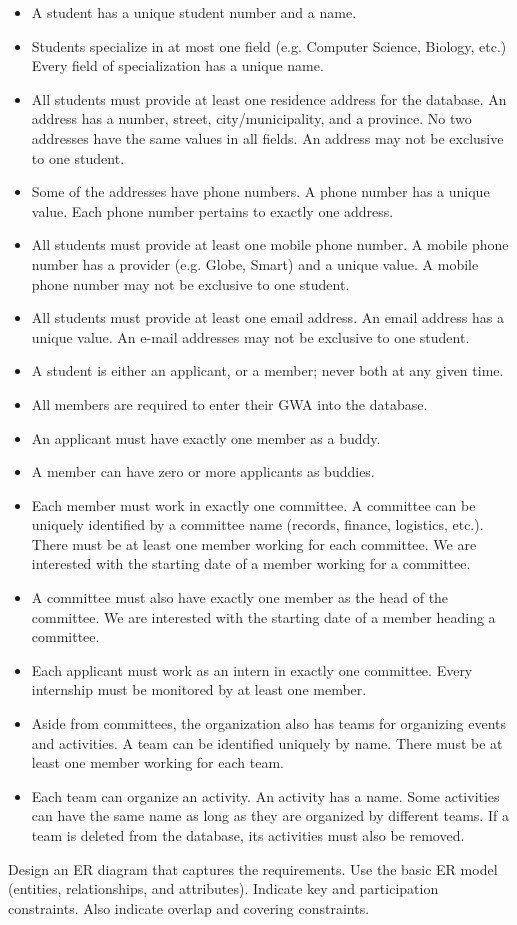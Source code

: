 \documentclass[12pt]{article}
\begin{document}
\begin{itemize}
  \item A student has a unique student number and a name.
  \item Students specialize in at most one field (e.g. Computer Science, Biology, etc.) Every field of specialization has a unique name.
  \item All students must provide at least one residence address for the database. An address has a number, street, city/municipality, and a province. No two addresses have the same values in all fields. An address may not be exclusive to one student. 
  \item Some of the addresses have phone numbers. A phone number has a unique value. Each phone number pertains to exactly one address.
  \item All students must provide at least one mobile phone number. A mobile phone number has a provider (e.g. Globe, Smart) and a unique value. A mobile phone number may not be exclusive to one student.
  \item All students must provide at least one email address. An email address has a unique value. An e-mail addresses may not be exclusive to one student.
  \item A student is either an applicant, or a member; never both at any given time.
  \item All members are required to enter their GWA into the database.
  \item An applicant must have exactly one member as a buddy.
  \item A member can have zero or more applicants as buddies.
  \item Each member must work in exactly one committee. A committee can be uniquely identified by a committee name (records, finance, logistics, etc.). There must be at least one member working for each committee. We are interested with the starting date of a member working for a committee.
  \item A committee must also have exactly one member as the head of the committee. We are interested with the starting date of a member heading a committee.
  \item Each applicant must work as an intern in exactly one committee. Every internship must be monitored by at least one member.
  \item Aside from committees, the organization also has teams for organizing events and activities. A team can be identified uniquely by name. There must be at least one member working for each team.
  \item Each team can organize an activity. An activity has a name. Some activities can have the same name as long as they are organized by different teams. If a team is deleted from the database, its activities must also be removed.
\end{itemize}

\noindent Design an ER diagram that captures the requirements. Use the basic ER model (entities, relationships, and attributes). Indicate key and participation constraints. Also indicate overlap and covering constraints.
\end{document}
